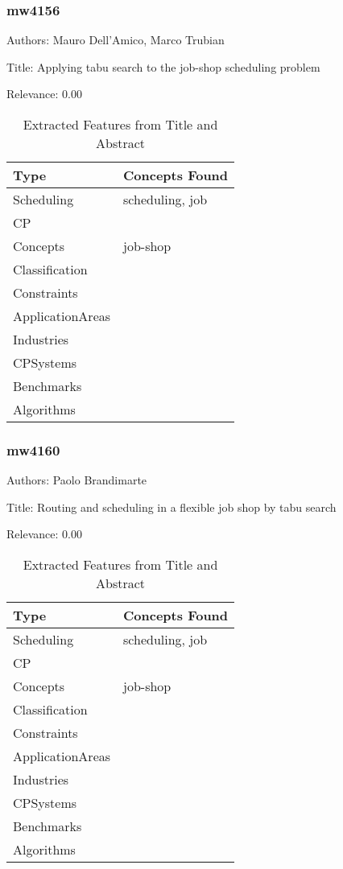 \subsubsection{mw4156}
\label{mw:mw4156}

Authors: Mauro Dell'Amico, Marco Trubian

Title: Applying tabu search to the job-shop scheduling problem

Relevance:  0.00

{\scriptsize
\begin{longtable}{p{2cm}p{20cm}}
\caption{Extracted Features from Title and Abstract}\\ \toprule
Type & Concepts Found\\ \midrule
\endhead
\bottomrule
\endfoot
Scheduling & scheduling, job\\ 
CP & \\ 
Concepts & job-shop\\ 
Classification & \\ 
Constraints & \\ 
ApplicationAreas & \\ 
Industries & \\ 
CPSystems & \\ 
Benchmarks & \\ 
Algorithms & \\ 
\end{longtable}
}



\subsubsection{mw4160}
\label{mw:mw4160}

Authors: Paolo Brandimarte

Title: Routing and scheduling in a flexible job shop by tabu search

Relevance:  0.00

{\scriptsize
\begin{longtable}{p{2cm}p{20cm}}
\caption{Extracted Features from Title and Abstract}\\ \toprule
Type & Concepts Found\\ \midrule
\endhead
\bottomrule
\endfoot
Scheduling & scheduling, job\\ 
CP & \\ 
Concepts & job-shop\\ 
Classification & \\ 
Constraints & \\ 
ApplicationAreas & \\ 
Industries & \\ 
CPSystems & \\ 
Benchmarks & \\ 
Algorithms & \\ 
\end{longtable}
}




